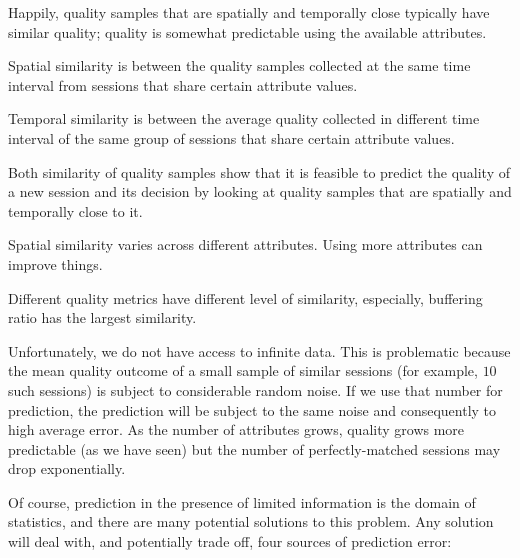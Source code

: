 Happily, quality samples that are spatially and temporally close typically have similar quality; quality is somewhat predictable using the available attributes.

 Spatial similarity is between the quality samples collected at the same time interval from sessions that share certain attribute values. 

 Temporal similarity is between the average quality collected in different time interval of the same group of sessions that share certain attribute values. 

 
\begin{packedenumerate}
	\item Both similarity of quality samples show that it is feasible to predict the quality of a new session and its decision by looking at quality samples that are spatially and temporally close to it.
	\item Spatial similarity varies across different attributes.  Using more attributes can improve things.
	\item Different quality metrics have different level of similarity, especially, buffering ratio has the largest similarity.
\end{packedenumerate}

Unfortunately, we do not have access to infinite data.  This is problematic because the mean quality outcome of a small sample of similar sessions (for example, $10$ such sessions) is subject to considerable random noise.  If we use that number for prediction, the prediction will be subject to the same noise and consequently to high average error.  As the number of attributes grows, quality grows more predictable (as we have seen) but the number of perfectly-matched sessions may drop exponentially.

Of course, prediction in the presence of limited information is the domain of statistics, and there are many potential solutions to this problem.  Any solution will deal with, and potentially trade off, four sources of prediction error:

